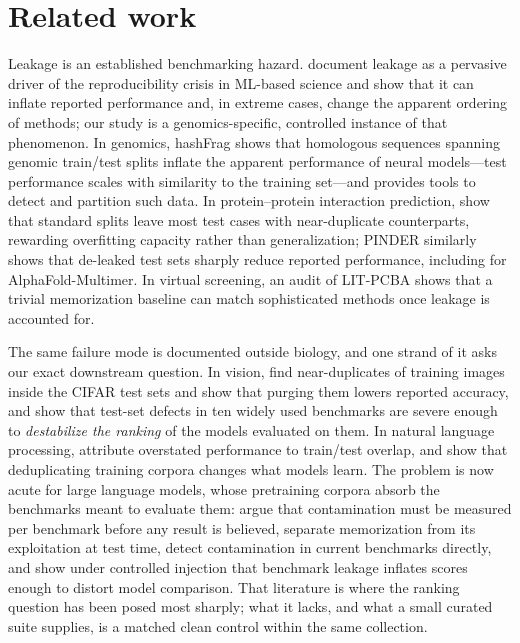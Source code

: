 \documentclass[webpdf,modern,large,namedate]{oup-authoring-template}%
\begin{document}
\section{Related work}\label{sec:related}

Leakage is an established benchmarking hazard. \citet{kapoor2023leakage} document leakage as a pervasive driver of the reproducibility crisis in ML-based science and show that it can inflate reported performance and, in extreme cases, change the apparent ordering of methods; our study is a genomics-specific, controlled instance of that phenomenon. In genomics, hashFrag \citep{rafi2025} shows that homologous sequences spanning genomic train/test splits inflate the apparent performance of neural models---test performance scales with similarity to the training set---and provides tools to detect and partition such data. In protein--protein interaction prediction, \citet{bushuiev2024} show that standard splits leave most test cases with near-duplicate counterparts, rewarding overfitting capacity rather than generalization; PINDER \citep{kovtun2024} similarly shows that de-leaked test sets sharply reduce reported performance, including for AlphaFold-Multimer. In virtual screening, an audit of LIT-PCBA \citep{huang2025} shows that a trivial memorization baseline can match sophisticated methods once leakage is accounted for.

The same failure mode is documented outside biology, and one strand of it asks our exact downstream question. In vision, \citet{barz2020cifar} find near-duplicates of training images inside the CIFAR test sets and show that purging them lowers reported accuracy, and \citet{northcutt2021labelerrors} show that test-set defects in ten widely used benchmarks are severe enough to \emph{destabilize the ranking} of the models evaluated on them. In natural language processing, \citet{elangovan2021leakage} attribute overstated performance to train/test overlap, and \citet{lee2022dedup} show that deduplicating training corpora changes what models learn. The problem is now acute for large language models, whose pretraining corpora absorb the benchmarks meant to evaluate them: \citet{sainz2023contamination} argue that contamination must be measured per benchmark before any result is believed, \citet{magar2022contamination} separate memorization from its exploitation at test time, \citet{deng2024contamination} detect contamination in current benchmarks directly, and \citet{zhou2023cheater} show under controlled injection that benchmark leakage inflates scores enough to distort model comparison. That literature is where the ranking question has been posed most sharply; what it lacks, and what a small curated suite supplies, is a matched clean control within the same collection.
\end{document}
